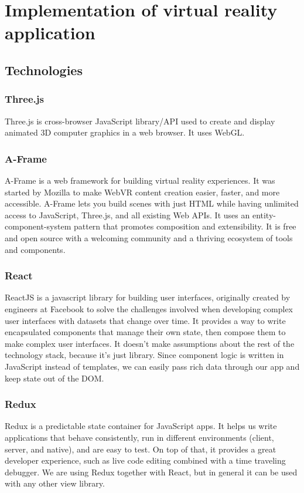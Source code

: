 \section{Implementation of virtual reality application}

\subsection{Technologies}
\subsubsection{Three.js}
Three.js is cross-browser JavaScript library/API used to create and display animated 3D computer graphics in a web browser. It uses WebGL.

\subsubsection{A-Frame}
A-Frame is a web framework for building virtual reality experiences. It was started by Mozilla to make WebVR content creation easier, faster, and more accessible. A-Frame lets you build scenes with just HTML while having unlimited access to JavaScript, Three.js, and all existing Web APIs. It uses an entity-component-system pattern that promotes composition and extensibility. It is free and open source with a welcoming community and a thriving ecosystem of tools and components.

\subsubsection{React}
ReactJS is a javascript library for building user interfaces, originally created by engineers at Facebook to solve the challenges involved when developing complex user interfaces with datasets that change over time. It provides a way to write encapsulated components that manage their own state, then compose them to make complex user interfaces. It doesn't make assumptions about the rest of the technology stack, because it’s just library. Since component logic is written in JavaScript instead of templates, we can easily pass rich data through our app and keep state out of the DOM.

\subsubsection{Redux}
Redux is a predictable state container for JavaScript apps. It helps us write applications that behave consistently, run in different environments (client, server, and native), and are easy to test. On top of that, it provides a great developer experience, such as live code editing combined with a time traveling debugger. We are using Redux together with React, but in general it can be used with any other view library.

